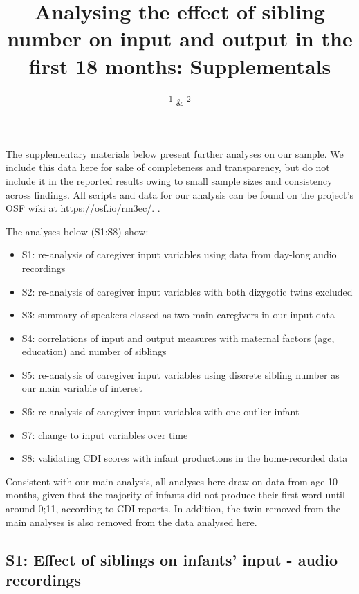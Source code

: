 \documentclass[
  man,mask,floatsintext]{apa6}
\title{Analysing the effect of sibling number on input and output in the first 18 months: Supplementals}
\author{\textsuperscript{1} \& \textsuperscript{2}}
\date{}
\affiliation{\vspace{0.5cm}\textsuperscript{1} \\\textsuperscript{2} }
\providecommand{\tightlist}{%
  \setlength{\itemsep}{0pt}\setlength{\parskip}{0pt}}
\begin{document}
\maketitle

The supplementary materials below present further analyses on our sample. We include this data here for sake of completeness and transparency, but do not include it in the reported results owing to small sample sizes and consistency across findings. All scripts and data for our analysis can be found on the project's OSF wiki at \url{https://osf.io/rm3ec/}. .

The analyses below (S1:S8) show:

\begin{itemize}
\tightlist
\item
  S1: re-analysis of caregiver input variables using data from day-long audio recordings
\item
  S2: re-analysis of caregiver input variables with both dizygotic twins excluded
\item
  S3: summary of speakers classed as two main caregivers in our input data
\item
  S4: correlations of input and output measures with maternal factors (age, education) and number of siblings
\item
  S5: re-analysis of caregiver input variables using discrete sibling number as our main variable of interest
\item
  S6: re-analysis of caregiver input variables with one outlier infant
\item
  S7: change to input variables over time
\item
  S8: validating CDI scores with infant productions in the home-recorded data
\end{itemize}

Consistent with our main analysis, all analyses here draw on data from age 10 months, given that the majority of infants did not produce their first word until around 0;11, according to CDI reports. In addition, the twin removed from the main analyses is also removed from the data analysed here.

\hypertarget{s1-effect-of-siblings-on-infants-input---audio-recordings}{%
\subsection{S1: Effect of siblings on infants' input - audio recordings}\label{s1-effect-of-siblings-on-infants-input---audio-recordings}}
\end{document}
